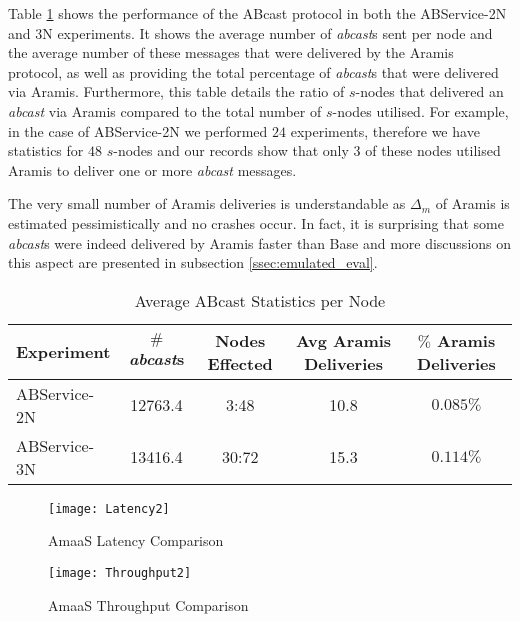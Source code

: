     Table \ref{table:emulated_transcation_aramis_deliveries} shows the performance of the \textsf{ABcast} protocol in both the ABService-2N and 3N experiments.  It shows the average number of \emph{abcast}s sent per node and the average number of these messages that were delivered by the Aramis protocol, as well as providing the total percentage of \emph{abcast}s that were delivered via Aramis.  Furthermore, this table details the ratio of $s$-nodes that delivered an \emph{abcast} via Aramis compared to the total number of $s$-nodes utilised.  For example, in the case of ABService-2N we performed $24$ experiments, therefore we have statistics for $48$ $s$-nodes and our records show that only $3$ of these nodes utilised Aramis to deliver one or more \emph{abcast} messages.  
    
    The very small number of \textsf{Aramis} deliveries is understandable as $\Delta_m$ of \textsf{Aramis} is estimated pessimistically and no crashes occur.  In fact, it is surprising that some \emph{abcast}s were indeed delivered by \textsf{Aramis} faster than \textsf{Base} and more discussions on this aspect are presented in subsection \ref{ssec:emulated_eval}.  
	
	\begin{table}[h]
	  \begin{center}
	    \begin{tabular}{|l|c|c|c|c|}
	    \hline
	    Experiment  & $\#$ \emph{abcast}s & Nodes Effected &  Avg Aramis Deliveries & $\%$ Aramis Deliveries \\ \hline \hline
	    ABService-2N & 12763.4 & 3:48   & 10.8  & $0.085\%$  \\ \hline
	    ABService-3N & 13416.4 & 30:72 & 15.3  & $0.114\%$ \\ \hline
	    \end{tabular}
	    \caption{Average ABcast Statistics per Node}
	    \label{table:emulated_transcation_aramis_deliveries}
	  \end{center}
	\end{table}	
	
	\begin{figure}[h]
	 \texttt{[image: Latency2]}
	 \caption{AmaaS Latency Comparison}
	 \label{fig:LatencyGraph}
	\end{figure}
	
	\begin{figure}[h]
	 \texttt{[image: Throughput2]}
	 \caption{AmaaS Throughput Comparison}
	 \label{fig:ThroughputGraph}
	\end{figure}	
	
